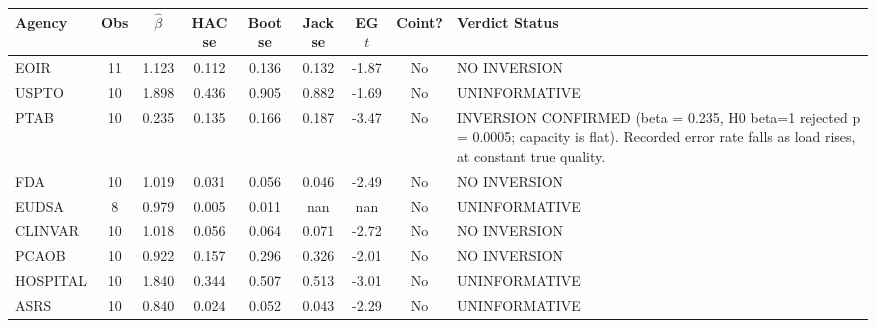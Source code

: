 \begin{tabular}{lcccccccl}
\hline
\textbf{Agency} & \textbf{Obs} & $\hat{\beta}$ & \textbf{HAC se} & \textbf{Boot se} & \textbf{Jack se} & \textbf{EG } $t$ & \textbf{Coint?} & \textbf{Verdict Status} \\
\hline
EOIR & 11 & 1.123 & 0.112 & 0.136 & 0.132 & -1.87 & No & NO INVERSION \\
USPTO & 10 & 1.898 & 0.436 & 0.905 & 0.882 & -1.69 & No & UNINFORMATIVE \\
PTAB & 10 & 0.235 & 0.135 & 0.166 & 0.187 & -3.47 & No & INVERSION CONFIRMED (beta = 0.235, H0 beta=1 rejected p = 0.0005; capacity is flat). Recorded error rate falls as load rises, at constant true quality. \\
FDA & 10 & 1.019 & 0.031 & 0.056 & 0.046 & -2.49 & No & NO INVERSION \\
EUDSA & 8 & 0.979 & 0.005 & 0.011 & nan & nan & No & UNINFORMATIVE \\
CLINVAR & 10 & 1.018 & 0.056 & 0.064 & 0.071 & -2.72 & No & NO INVERSION \\
PCAOB & 10 & 0.922 & 0.157 & 0.296 & 0.326 & -2.01 & No & NO INVERSION \\
HOSPITAL & 10 & 1.840 & 0.344 & 0.507 & 0.513 & -3.01 & No & UNINFORMATIVE \\
ASRS & 10 & 0.840 & 0.024 & 0.052 & 0.043 & -2.29 & No & UNINFORMATIVE \\
\hline
\end{tabular}
